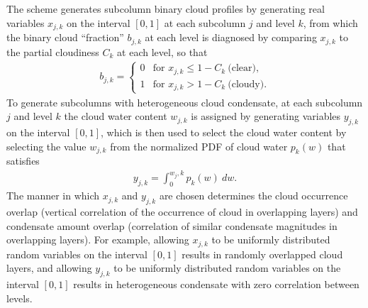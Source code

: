 \documentclass[letter]{article}
\begin{document}
The \cite{raisanen_et_al_2004} scheme generates subcolumn binary cloud profiles by generating real variables $x_{j,k}$ on the interval $[0,1]$ at each subcolumn $j$ and level $k$, from which the binary cloud ``fraction'' $b_{j,k}$ at each level is diagnosed by comparing $x_{j,k}$ to the partial cloudiness $C_k$ at each level, so that
\begin{gather}
    b_{j,k} = 
        \begin{cases}
            0 & \text{for } x_{j,k} \le 1 - C_k ~\text{(clear)}, \\
            1 & \text{for } x_{j,k} > 1 - C_k ~\text{(cloudy)}.
        \end{cases}
\end{gather}
To generate subcolumns with heterogeneous cloud condensate, at each subcolumn $j$ and level $k$ the cloud water content $w_{j,k}$ is assigned by generating variables $y_{j,k}$ on the interval $[0,1]$, which is then used to select the cloud water content by selecting the value $w_{j,k}$ from the normalized PDF of cloud water $p_k(w)$ that satisfies
\begin{gather}
    y_{j,k} = \int_0^{w_j,k} p_k(w)~dw.
\end{gather}
The manner in which $x_{j,k}$ and $y_{j,k}$ are chosen determines the cloud occurrence overlap (vertical correlation of the occurrence of cloud in overlapping layers) and condensate amount overlap (correlation of similar condensate magnitudes in overlapping layers). For example, allowing $x_{j,k}$ to be uniformly distributed random variables on the interval $[0,1]$ results in randomly overlapped cloud layers, and allowing $y_{j,k}$ to be uniformly distributed random variables on the interval $[0,1]$ results in heterogeneous condensate with zero correlation between levels. 
\end{document}
